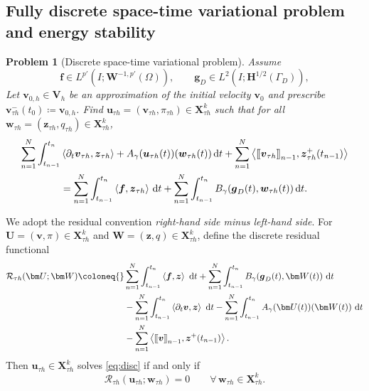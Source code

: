 \documentclass[DIV=16]{scrartcl}
\newtheorem{problem}[theorem]{Problem}
\newcommand{\Ip}[2]{\left\langle #1,#2\right\rangle}
\newcommand{\uu}{\boldsymbol v}
\renewcommand{\vv}{\boldsymbol z}
\newcommand{\ff}{\boldsymbol f}
\newcommand{\ljump}{\mathopen{[\mkern-2mu[}}
\newcommand{\rjump}{\mathclose{]\mkern-2mu]}}
\newcommand{\jump}[1]{\ljump #1 \rjump}
\newcommand{\It}{I}
\newcommand{\dt}{\partial_t}
\newcommand{\drv}{\mkern3mu\mathrm{d}}
\newcommand{\Dt}{\drv t}
\newcommand{\GhD}{\Gamma_{D}}
\newcommand{\Vh}{\boldsymbol V_h}
\newcommand{\pn}{p}
\newcommand{\pnp}{\pn'}
\begin{document}
\subsection{Fully discrete space-time variational problem and energy stability}
\label{sec:st-fully-discrete}

\begin{problem}[Discrete space-time variational problem]
\label{Prob:DVP-pns}
Assume
\[
  \ff\in L^{\pnp}(\It;\boldsymbol W^{-1,\pnp}(\Omega)),
  \qquad
  \boldsymbol g_D\in L^2(\It;\boldsymbol H^{1/2}(\GhD)),
\]
Let $\uu_{0,h}\in \Vh$ be an approximation of the initial velocity $\uu_0$ and
prescribe $\uu_{\tau h}^-(t_0)\coloneq \uu_{0,h}$.
Find $\boldsymbol u_{\tau h}=(\uu_{\tau h},\pi_{\tau h})\in \boldsymbol X_{\tau h}^{k}$
such that for all $\boldsymbol w_{\tau h}=(\vv_{\tau h},q_{\tau h})\in \boldsymbol X_{\tau h}^{k}$,
\begin{equation}
\label{eq:disc}
\begin{aligned}
\sum_{n=1}^{N}\int_{t_{n-1}}^{t_n} &\Ip{\dt \uu_{\tau h}}{\vv_{\tau h}}
+ A_\gamma(\boldsymbol u_{\tau h}(t))(\boldsymbol w_{\tau h}(t))\Dt
+ \sum_{n=1}^{N}\Ip{\jump{\uu_{\tau h}}_{n-1}}{\vv_{\tau h}^+(t_{n-1})}
\\
&=
\sum_{n=1}^{N}\int_{t_{n-1}}^{t_n}\Ip{\ff}{\vv_{\tau h}}\Dt
+ \sum_{n=1}^{N}\int_{t_{n-1}}^{t_n} B_\gamma(\boldsymbol g_D(t),\boldsymbol w_{\tau h}(t))\Dt.
\end{aligned}
\end{equation}
\end{problem}

We adopt the residual convention \emph{right-hand side minus left-hand side}.
For $\bm U=(\uu,\pi)\in \boldsymbol X_{\tau h}^k$ and
$\bm W=(\vv,q)\in \boldsymbol X_{\tau h}^k$, define the discrete residual
functional
\begin{equation}
\label{eq:disc-residual}
\begin{aligned}
\mathcal R_{\tau h}(\bm U;\bm W)
\coloneq {}&
\sum_{n=1}^{N}\int_{t_{n-1}}^{t_n}\Ip{\ff}{\vv}\,\Dt
+ \sum_{n=1}^{N}\int_{t_{n-1}}^{t_n} B_\gamma(\boldsymbol g_D(t),\bm W(t))\,\Dt
\\
&-
\sum_{n=1}^{N}\int_{t_{n-1}}^{t_n}\Ip{\dt \uu}{\vv}\,\Dt
- \sum_{n=1}^{N}\int_{t_{n-1}}^{t_n} A_\gamma(\bm U(t))(\bm W(t))\,\Dt
\\
&- \sum_{n=1}^{N}\Ip{\jump{\uu}_{n-1}}{\vv^+(t_{n-1})}.
\end{aligned}
\end{equation}
Then $\boldsymbol u_{\tau h}\in \boldsymbol X_{\tau h}^k$ solves \eqref{eq:disc} if and
only if
\[
  \mathcal R_{\tau h}(\boldsymbol u_{\tau h};\bm w_{\tau h})=0
  \qquad
  \forall\,\bm w_{\tau h}\in \boldsymbol X_{\tau h}^k.
\]
\end{document}
